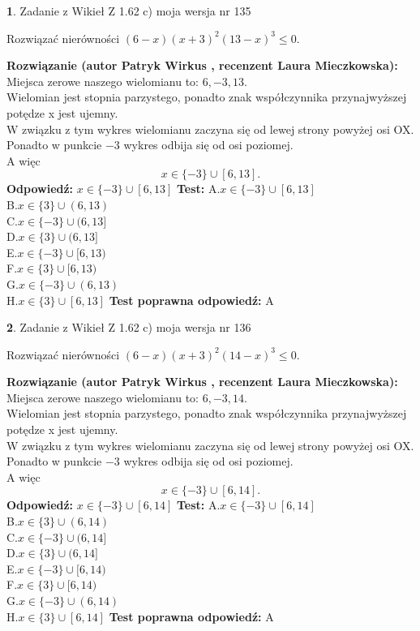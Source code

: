 \documentclass[12pt, a4paper]{article}
\theoremstyle{definition} %
\newtheorem{zad}{}
\newcommand{\zadStart}[1]{\begin{zad}#1\newline}
\newcommand{\zadStop}{\end{zad}}
\newcommand{\rozwStart}[2]{\noindent \textbf{Rozwiązanie (autor #1 , recenzent #2): }\newline}
\newcommand{\rozwStop}{\newline}
\newcommand{\odpStart}{\noindent \textbf{Odpowiedź:}\newline}
\newcommand{\odpStop}{\newline}
\newcommand{\testStart}{\noindent \textbf{Test:}\newline}
\newcommand{\testStop}{\newline}
\newcommand{\kluczStart}{\noindent \textbf{Test poprawna odpowiedź:}\newline}
\newcommand{\kluczStop}{\newline}
\begin{document}
\zadStart{Zadanie z Wikieł Z 1.62 c) moja wersja nr 135}

Rozwiązać nierówności $(6-x)(x+3)^{2}(13-x)^{3}\le0$.
\zadStop
\rozwStart{Patryk Wirkus}{Laura Mieczkowska}
Miejsca zerowe naszego wielomianu to: $6, -3, 13$.\\
Wielomian jest stopnia parzystego, ponadto znak współczynnika przy\linebreak najwyższej potędze x jest ujemny.\\ W związku z tym wykres wielomianu zaczyna się od lewej strony powyżej osi OX.\\
Ponadto w punkcie $-3$ wykres odbija się od osi poziomej.\\
A więc $$x \in \{-3\} \cup [6,13].$$
\rozwStop
\odpStart
$x \in \{-3\} \cup [6,13]$
\odpStop
\testStart
A.$x \in \{-3\} \cup [6,13]$\\
B.$x \in \{3\} \cup (6,13)$\\
C.$x \in \{-3\} \cup (6,13]$\\
D.$x \in \{3\} \cup (6,13]$\\
E.$x \in \{-3\} \cup [6,13)$\\
F.$x \in \{3\} \cup [6,13)$\\
G.$x \in \{-3\} \cup (6,13)$\\
H.$x \in \{3\} \cup [6,13]$
\testStop
\kluczStart
A
\kluczStop



\zadStart{Zadanie z Wikieł Z 1.62 c) moja wersja nr 136}

Rozwiązać nierówności $(6-x)(x+3)^{2}(14-x)^{3}\le0$.
\zadStop
\rozwStart{Patryk Wirkus}{Laura Mieczkowska}
Miejsca zerowe naszego wielomianu to: $6, -3, 14$.\\
Wielomian jest stopnia parzystego, ponadto znak współczynnika przy\linebreak najwyższej potędze x jest ujemny.\\ W związku z tym wykres wielomianu zaczyna się od lewej strony powyżej osi OX.\\
Ponadto w punkcie $-3$ wykres odbija się od osi poziomej.\\
A więc $$x \in \{-3\} \cup [6,14].$$
\rozwStop
\odpStart
$x \in \{-3\} \cup [6,14]$
\odpStop
\testStart
A.$x \in \{-3\} \cup [6,14]$\\
B.$x \in \{3\} \cup (6,14)$\\
C.$x \in \{-3\} \cup (6,14]$\\
D.$x \in \{3\} \cup (6,14]$\\
E.$x \in \{-3\} \cup [6,14)$\\
F.$x \in \{3\} \cup [6,14)$\\
G.$x \in \{-3\} \cup (6,14)$\\
H.$x \in \{3\} \cup [6,14]$
\testStop
\kluczStart
A
\kluczStop
\end{document}
